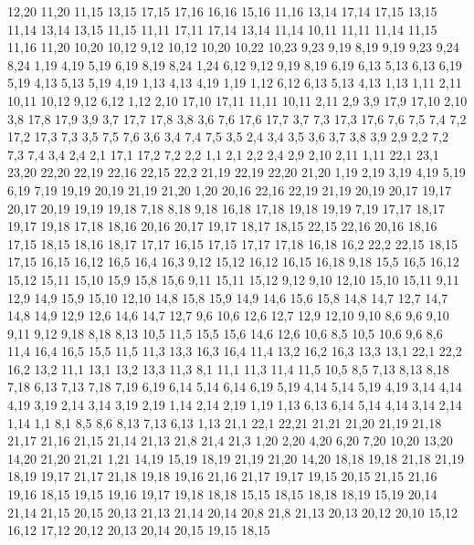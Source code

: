 12,20
11,20
%
11,15
13,15
17,15
17,16
16,16
15,16
11,16
%
13,14
17,14
17,15
13,15
%
11,14
13,14
13,15
11,15
%
11,11
17,11
17,14
13,14
11,14
%
10,11
11,11
11,14
11,15
11,16
11,20
10,20
10,12
%
9,12
10,12
10,20
10,22
10,23
9,23
9,19
%
8,19
9,19
9,23
9,24
8,24
%
1,19
4,19
5,19
6,19
8,19
8,24
1,24
%
6,12
9,12
9,19
8,19
6,19
6,13
%
5,13
6,13
6,19
5,19
%
4,13
5,13
5,19
4,19
%
1,13
4,13
4,19
1,19
%
1,12
6,12
6,13
5,13
4,13
1,13
%
1,11
2,11
10,11
10,12
9,12
6,12
1,12
%
2,10
17,10
17,11
11,11
10,11
2,11
%
2,9
3,9
17,9
17,10
2,10
%
3,8
17,8
17,9
3,9
%
3,7
17,7
17,8
3,8
%
3,6
7,6
17,6
17,7
3,7
%
7,3
17,3
17,6
7,6
7,5
7,4
%
7,2
17,2
17,3
7,3
%
3,5
7,5
7,6
3,6
%
3,4
7,4
7,5
3,5
%
2,4
3,4
3,5
3,6
3,7
3,8
3,9
2,9
%
2,2
7,2
7,3
7,4
3,4
2,4
%
2,1
17,1
17,2
7,2
2,2
%
1,1
2,1
2,2
2,4
2,9
2,10
2,11
1,11
22,1
23,1
23,20
22,20
22,19
22,16
22,15
22,2
%
21,19
22,19
22,20
21,20
%
1,19
2,19
3,19
4,19
5,19
6,19
7,19
19,19
20,19
21,19
21,20
1,20
%
20,16
22,16
22,19
21,19
20,19
20,17
%
19,17
20,17
20,19
19,19
19,18
%
7,18
8,18
9,18
16,18
17,18
19,18
19,19
7,19
%
17,17
18,17
19,17
19,18
17,18
%
18,16
20,16
20,17
19,17
18,17
%
18,15
22,15
22,16
20,16
18,16
%
17,15
18,15
18,16
18,17
17,17
%
16,15
17,15
17,17
17,18
16,18
%
16,2
22,2
22,15
18,15
17,15
16,15
16,12
16,5
16,4
16,3
%
9,12
15,12
16,12
16,15
16,18
9,18
%
15,5
16,5
16,12
15,12
15,11
15,10
15,9
15,8
15,6
%
9,11
15,11
15,12
9,12
%
9,10
12,10
15,10
15,11
9,11
%
12,9
14,9
15,9
15,10
12,10
%
14,8
15,8
15,9
14,9
%
14,6
15,6
15,8
14,8
14,7
%
12,7
14,7
14,8
14,9
12,9
%
12,6
14,6
14,7
12,7
%
9,6
10,6
12,6
12,7
12,9
12,10
9,10
%
8,6
9,6
9,10
9,11
9,12
9,18
8,18
8,13
%
10,5
11,5
15,5
15,6
14,6
12,6
10,6
%
8,5
10,5
10,6
9,6
8,6
%
11,4
16,4
16,5
15,5
11,5
%
11,3
13,3
16,3
16,4
11,4
%
13,2
16,2
16,3
13,3
%
13,1
22,1
22,2
16,2
13,2
%
11,1
13,1
13,2
13,3
11,3
%
8,1
11,1
11,3
11,4
11,5
10,5
8,5
%
7,13
8,13
8,18
7,18
%
6,13
7,13
7,18
7,19
6,19
6,14
%
5,14
6,14
6,19
5,19
%
4,14
5,14
5,19
4,19
%
3,14
4,14
4,19
3,19
%
2,14
3,14
3,19
2,19
%
1,14
2,14
2,19
1,19
%
1,13
6,13
6,14
5,14
4,14
3,14
2,14
1,14
%
1,1
8,1
8,5
8,6
8,13
7,13
6,13
1,13
21,1
22,1
22,21
21,21
21,20
21,19
21,18
21,17
21,16
21,15
21,14
21,13
21,8
21,4
21,3
%
1,20
2,20
4,20
6,20
7,20
10,20
13,20
14,20
21,20
21,21
1,21
%
14,19
15,19
18,19
21,19
21,20
14,20
%
18,18
19,18
21,18
21,19
18,19
%
19,17
21,17
21,18
19,18
%
19,16
21,16
21,17
19,17
%
19,15
20,15
21,15
21,16
19,16
%
18,15
19,15
19,16
19,17
19,18
18,18
%
15,15
18,15
18,18
18,19
15,19
%
20,14
21,14
21,15
20,15
%
20,13
21,13
21,14
20,14
%
20,8
21,8
21,13
20,13
20,12
20,10
%
15,12
16,12
17,12
20,12
20,13
20,14
20,15
19,15
18,15
